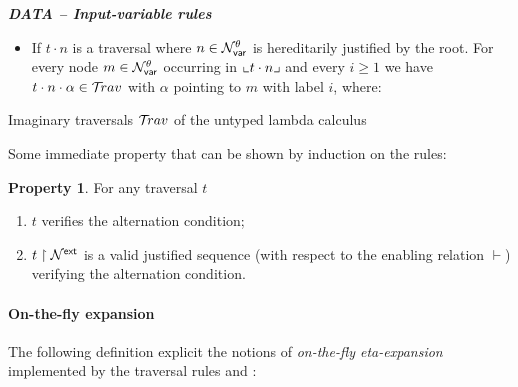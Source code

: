 \documentclass{article}
\theoremstyle{plain}
\theoremstyle{definition}
\newtheorem{property}{Property}[section]
\theoremstyle{remark}
\newcommand\Nodes{\mathcal{N}}%
\newcommand\NodesVar{\Nodes_{\sf var}}%
\newcommand{\ghostlmd}{{\lambda\!\!\lambda}}
\newcommand{\ghostvar}{\theta}
\newcommand\ImNodesVar{\NodesVar^\ghostvar}
\newcommand{\travulc}{\travset}
\newcommand{\enables}{\vdash} %
\newcommand{\ExtNodes}{\Nodes^{\sf ext}}
\begin{document}
\begin{FramedTable}
\emph{\bf DATA -- Input-variable rules}
\begin{itemize}
\item {} If $t \cdot n$ is a traversal where $n \in \ImNodesVar$ is hereditarily justified by the root. For every node $m \in \ImNodesVar$ occurring in $\llcorner t\cdot n \lrcorner$
and every $i\geq1$ we have $t \cdot n \cdot\alpha\in\travulc$ with $\alpha$ pointing to $m$ with label $i$, where:
\end{itemize}


\caption{Imaginary traversals $\travulc$ of the untyped lambda calculus}
 \label{tab:trav_rules}
\end{FramedTable}

Some immediate property that can be shown by induction on the rules:
\begin{property}
   For any traversal $t$
   \begin{enumerate}
   \item $t$ verifies the alternation condition;
   \item $t\filter\ExtNodes$ is a valid justified sequence (with respect to the enabling relation $\enables$) verifying the alternation condition.
   \end{enumerate}
\end{property}




\paragraph{On-the-fly expansion}
The following definition explicit the notions of \emph{on-the-fly eta-expansion} implemented by the
traversal rules  and :
\end{document}
